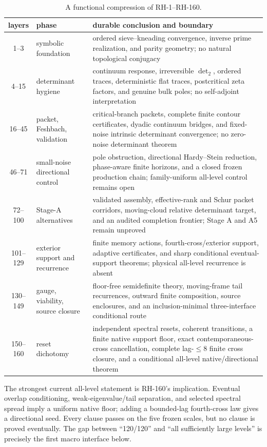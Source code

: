 \documentclass[11pt]{article}
\theoremstyle{definition}
\theoremstyle{remark}
\begin{document}
\begin{table}[t]
\centering
\small
\renewcommand{\arraystretch}{1.13}
\begin{tabular}{c>{\raggedright\arraybackslash}p{4.0cm}>{\raggedright\arraybackslash}p{7.8cm}}
\toprule
layers & phase & durable conclusion and boundary\\
\midrule
1--3 & symbolic foundation & ordered sieve--kneading convergence, inverse
prime realization, and parity geometry; no natural topological conjugacy\\
4--15 & determinant hygiene & continuum response, irreversible $\det_2$,
ordered traces, deterministic flat traces, postcritical zeta factors, and
genuine bulk poles; no self-adjoint interpretation\\
16--45 & packet, Feshbach, validation & critical-branch packets, complete
finite contour certificates, dyadic continuum bridges, and fixed-noise
intrinsic determinant convergence; no zero-noise determinant theorem\\
46--71 & small-noise directional control & pole obstruction, directional
Hardy--Stein reduction, phase-aware finite horizons, and a closed frozen
production chain; family-uniform all-level control remains open\\
72--100 & Stage-A alternatives & validated assembly, effective-rank and Schur
packet corridors, moving-cloud relative determinant target, and an audited
completion frontier; Stage A and A5 remain unproved\\
101--129 & exterior support and recurrence & finite memory actions,
fourth-cross/exterior support, adaptive certificates, and sharp conditional
eventual-support theorems; physical all-level recurrence is absent\\
130--149 & gauge, viability, source closure & floor-free semidefinite theory,
moving-frame tail recurrences, outward finite composition, source enclosures,
and an inclusion-minimal three-interface conditional route\\
150--160 & reset dichotomy & independent spectral resets, coherent
transitions, a finite native support floor, exact contemporaneous-cross
cancellation, complete lag-$\leq8$ finite cross closure, and a conditional
all-level native/directional theorem\\
\bottomrule
\end{tabular}
\caption{A functional compression of RH-1--RH-160.}
\label{tab:phases}
\end{table}

The strongest current all-level statement is RH-160's implication.  Eventual
overlap conditioning, weak-eigenvalue/tail separation, and selected spectral
spread imply a uniform native floor; adding a bounded-lag fourth-cross law
gives a directional seed.  Every clause passes on the five frozen scales,
but no clause is proved eventually.  The gap between ``120/120'' and
``all sufficiently large levels'' is precisely the first macro interface
below.
\end{document}
